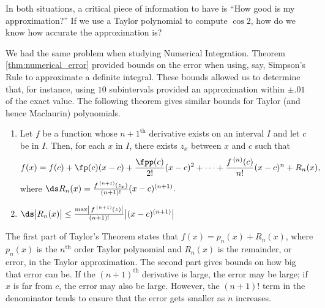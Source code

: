 	
In both situations, a critical piece of information to have is ``How good is my approximation?'' If we use a Taylor polynomial to compute $\cos 2$, how do we know how accurate the approximation is? 

We had the same problem when studying Numerical Integration. Theorem \ref{thm:numerical_error} provided bounds on the error when using, say, Simpson's Rule to approximate a definite integral. These bounds allowed us to determine that, for instance, using $10$ subintervals provided an approximation within $\pm .01$ of the exact value. The following theorem gives similar bounds for Taylor (and hence Maclaurin) polynomials.

\setboxwidth{65pt}
{\begin{enumerate}
\item	Let $f$ be a function whose $n+1^\text{th}$ derivative exists on an interval $I$ and let $c$ be in $I$. Then, for each $x$ in $I$, there exists $z_x$ between $x$ and $c$ such that
$$f(x) = f(c) + \fp(c)(x-c) + \frac{\fpp(c)}{2!}(x-c)^2+ \cdots +\frac{f\,^{(n)}(c)}{n!}(x-c)^n+R_n(x),$$
where $\ds R_n(x) = \frac{f\,^{(n+1)}(z_x)}{(n+1)!}(x-c)^{(n+1)}.$

\item		$\ds \big|R_n(x)\big| \leq \frac{\max\left|\,f\,^{(n+1)}(z)\right|}{(n+1)!}\big|(x-c)^{(n+1)}\big|$
\end{enumerate}
}
\restoreboxwidth

The first part of Taylor's Theorem states that $f(x) = p_n(x) + R_n(x)$, where $p_n(x)$ is the $n^\text{th}$ order Taylor polynomial and $R_n(x)$ is the remainder, or error, in the Taylor approximation. The second part gives bounds on how big that error can be. If the $(n+1)^\text{th}$ derivative is large, the error may be large; if $x$ is far from $c$, the error may also be large. However, the $(n+1)!$ term in the denominator tends to ensure that the error gets smaller as $n$ increases.

